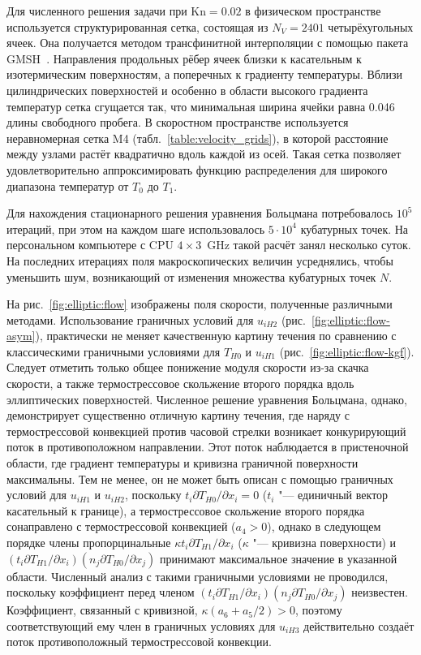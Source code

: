 \documentclass[
aps,%
12pt,%
final,%
notitlepage,%
oneside,%
onecolumn,%
nobibnotes,%
nofootinbib,%
superscriptaddress,%
noshowpacs,%
showkeys,%
floatfix,%
tightenlines,%
centertags]%
{revtex4}
\newcommand{\Kn}{\mathrm{Kn}}
\newcommand{\Pder}[2][]{\partial#1/\partial#2}
\begin{document}
Для численного решения задачи при \(\Kn=0.02\) в физическом пространстве
используется структурированная сетка, состоящая из \(N_V=2401\) четырёхугольных ячеек.
Она получается методом трансфинитной интерполяции с помощью пакета GMSH~\cite{gmsh2009}.
Направления продольных рёбер ячеек близки к касательным к изотермическим поверхностям,
а поперечных к градиенту температуры.
Вблизи цилиндрических поверхностей и особенно в области высокого градиента температур
сетка сгущается так, что минимальная ширина ячейки равна 0.046 длины свободного пробега.
В скоростном пространстве используется неравномерная сетка M4 (табл.~\ref{table:velocity_grids}),
в которой расстояние между узлами растёт квадратично вдоль каждой из осей.
Такая сетка позволяет удовлетворительно аппроксимировать функцию распределения
для широкого диапазона температур от \(T_0\) до \(T_1\).

Для нахождения стационарного решения уравнения Больцмана потребовалось \(10^5\) итераций,
при этом на каждом шаге использовалось \(5\cdot10^4\) кубатурных точек.
На персональном компьютере с CPU \(4\times3\)~GHz такой расчёт занял несколько суток.
На последних итерациях поля макроскопических величин усреднялись,
чтобы уменьшить шум, возникающий от изменения множества кубатурных точек \(N\).

На рис.~\ref{fig:elliptic:flow} изображены поля скорости, полученные различными методами.
Использование граничных условий для \(u_{iH2}\) (рис.~\ref{fig:elliptic:flow-asym}),
практически не меняет качественную картину течения по сравнению с классическими
граничными условиями для \(T_{H0}\) и \(u_{iH1}\) (рис.~\ref{fig:elliptic:flow-kgf}).
Следует отметить только общее понижение модуля скорости из-за скачка скорости,
а также термострессовое скольжение второго порядка вдоль эллиптических поверхностей.
Численное решение уравнения Больцмана, однако, демонстрирует существенно отличную картину течения,
где наряду с термострессовой конвекцией против часовой стрелки возникает конкурирующий поток
в противоположном направлении. Этот поток наблюдается в пристеночной области,
где градиент температуры и кривизна граничной поверхности максимальны.
Тем не менее, он не может быть описан с помощью граничных условий для \(u_{iH1}\) и \(u_{iH2}\),
поскольку \(t_i\Pder[T_{H0}]{x_i}=0\) (\(t_i\) "--- единичный вектор касательный к границе),
а термострессовое скольжение второго порядка сонаправлено с термострессовой конвекцией (\(a_4>0\)),
однако в следующем порядке члены пропорцинальные \(\kappa t_i\Pder[T_{H1}]{x_i}\)
(\(\kappa\) "--- кривизна поверхности) и \((t_i\Pder[T_{H1}]{x_i})(n_j\Pder[T_{H0}]{x_j})\)
принимают максимальное значение в указанной области.
Численный анализ с такими граничными условиями не проводился,
поскольку коэффициент перед членом \((t_i\Pder[T_{H1}]{x_i})(n_j\Pder[T_{H0}]{x_j})\) неизвестен.
Коэффициент, связанный с кривизной, \(\kappa(a_6+a_5/2)>0\),
поэтому соответствующий ему член в граничных условиях для \(u_{iH3}\)
действительно создаёт поток противоположный термострессовой конвекции.
\end{document}
